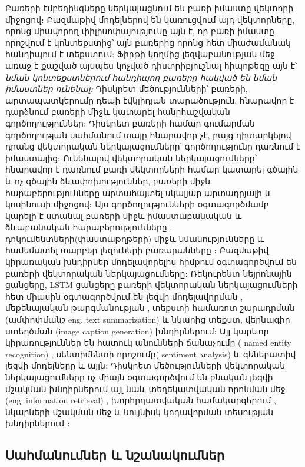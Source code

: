 \documentclass[11pt]{article}
\begin{document}
\par Բառերի էմբեդինգները ներկայացնում են բառի իմաստը վեկտորի միջոցով։ Բազմաթիվ մոդելներով են կառուցվում այդ վեկտորները, որոնց միավորող փիլիսոփայությունը այն է, որ բառի իմաստը որոշվում է կոնտեքստից՝ այն բառերից որոնց հետ միաժամանակ հանդիպում է տեքստում:  Ֆիրթի \cite{bib_item_1} կողմից լեզվաբանության մեջ առաջ է քաշված այսպես կոչված դիստրիբյուշնալ հիպոթեզը այն է՝ \textit{նման կոնտեքստներում հանդիպող բառերը հակված են նման իմաստներ ունենալ:}  Դիսկրետ մեծությունների՝ բառերի, արտապատկերումը դեպի էվկլիդյան տարածություն, հնարավոր է դարձնում բառերի միջև կատարել հանրհաշվական գործողություններ։ Դիսկրետ բառերի համար  գումարման գործողության սահմանում տալը հնարավոր չէ, բայց դիտարկելով դրանց վեկտորական ներկայացումները՝ գործողությունը դառնում է իմաստալից։  Ունենալով վեկտորական ներկայացումները՝  հնարավոր է դառնում բառի վեկտորների համար կատարել գծային և ոչ գծային ձևափոխություններ, բառերի միջև հարաբերությունները արտահայտել սկալյար արտադրյալի և կոսինուսի միջոցով։  Այս գործողությունների օգտագործմամբ կարելի է ստանալ բառերի միջև իմաստաբանական և ձևաբանական հարաբերությունները \cite{bib_item_2},  դոկումենտների(փաստաթղթերի) միջև նմանությունները \cite{bib_item_3} և համեմատել տարբեր լեզուների բառարանները \cite{bib_item_4}։ Բազմաթիվ կիրառական խնդիրներ մոդելավորելիս հիմքում օգտագործվում են բառերի վեկտորական ներկայացումները։  Ռեկուրենտ նեյրոնային ցանցերը, LSTM\cite{bib_item_5} ցանցերը բառերի վեկտորական ներկայացումների հետ միասին  օգտագործվում  են լեզվի մոդելավորման \cite{bib_item_6}, մեքենայական թարգմանության \cite{bib_item_7,  bib_item_8},  տեքստի համառոտ շարադրման (ամփոփմանշ eng. text summarization) \cite{bib_item_9} և նկարից տեքստ, վերնագիր ստեղծման (image caption generation) \cite{bib_item_10, bib_item_11} խնդիրներում։ Այլ կարևոր կիրառություններ են հատուկ անունների ճանաչումը ( named entity recognition) \cite{bib_item_12},  սենտիմենտի որոշումը( sentiment analysis) \cite{bib_item_13} և գեներատիվ լեզվի մոդելները \cite{bib_item_14} և այլն։ Դիսկրետ մեծությունների վեկտորական ներկայացումները ոչ միայն օգտագործվում են բնական լեզվի մշակման խնդիրներում այլ նաև տեղեկատվական որոնման մեջ (eng. information retrieval) \cite{bib_item_13, bib_item_15, bib_item_16 }, խորհրդատվական համակարգերում \cite{bib_item_17, bib_item_18}, նկարների մշակման մեջ \cite{bib_item_19} և նույնիսկ կոդավորման տեսության խնդիրներում \cite{bib_item_20}։

\subsection*{\hfill Սահմանումներ և նշանակումներ \hfill} \noindent
{}
{}
\end{document}
